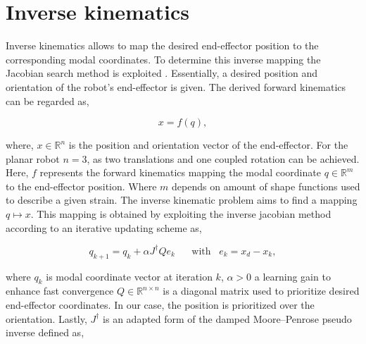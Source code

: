 \section{Inverse kinematics}
\label{app:chap2}



Inverse kinematics allows to map the desired end-effector position to the corresponding modal coordinates. To determine this inverse mapping the Jacobian search method is exploited \cite{JacobianInverse}. Essentially, a desired position and orientation of the robot's end-effector is given. The derived forward kinematics can be regarded as,

\begin{equation}
    x = f(q),
\end{equation}

where, $x \in \mathbb{R}^n$ is the position and orientation vector of the end-effector. For the planar robot $n = 3$, as two translations and one coupled rotation can be achieved. Here, $f$ represents the forward kinematics mapping the modal coordinate $q \in \mathbb{R}^m$ to the end-effector position. Where $m$ depends on amount of shape functions used to describe a given strain. The inverse kinematic problem aims to find a mapping $q\mapsto x$. This mapping is obtained by exploiting the inverse jacobian method according to an iterative updating scheme as,

\begin{equation}
    q_{k+1} = q_k + \alpha J^\dagger Q e_k \hspace{20pt} \text{with} \hspace{10pt}  e_k = x_d - x_k,
    \label{eq2:qupdate}
\end{equation}

where $q_k$ is modal coordinate vector at iteration $k$, $\alpha > 0$ a learning gain to enhance fast convergence $Q \in \mathbb{R}^{n\times n}$ is a diagonal matrix used to prioritize desired end-effector coordinates. In our case, the position is prioritized over the orientation. Lastly, $J^\dagger$ is an adapted form of the damped Moore–Penrose pseudo inverse defined as,

